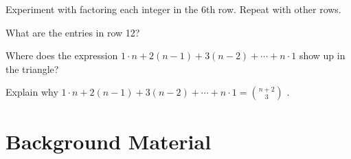 \documentclass[10pt,]{book}
\theoremstyle{plain}
\theoremstyle{definition}
\theoremstyle{definition}
\theoremstyle{definition}
\theoremstyle{definition}
\numberwithin{equation}{chapter}
\begin{document}
\begin{divisionexercise}{3}\hypertarget{exercise-173}{}
\hypertarget{p-1236}{}%
Experiment with factoring each integer in the 6th row. Repeat with other rows.%
\end{divisionexercise}%
\begin{divisionexercise}{4}\hypertarget{exercise-174}{}
\hypertarget{p-1237}{}%
What are the entries in row 12?%
\end{divisionexercise}%
\begin{divisionexercise}{5}\hypertarget{exercise-175}{}
\hypertarget{p-1238}{}%
Where does the expression \(1 \cdot n + 2\left( n - 1 \right) + 3\left( n - 2 \right) + \cdots + n \cdot 1\) show up in the triangle?%
\end{divisionexercise}%
\begin{divisionexercise}{6}\hypertarget{exercise-176}{}
\hypertarget{p-1239}{}%
Explain why \(1 \cdot n + 2\left( n - 1 \right) + 3\left( n - 2 \right) + \cdots + n \cdot 1 =
\binom{n + 2}{3}\) .%
\end{divisionexercise}%
\typeout{************************************************}
\typeout{************************************************}
\chapter[{Background Material}]{Background Material}\label{ch_additionalTopics}
\typeout{************************************************}
\typeout{************************************************}
\end{document}
